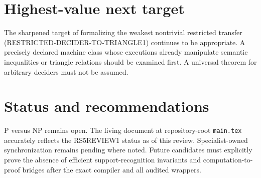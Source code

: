 \documentclass[11pt]{article}
\begin{document}
\section{Highest-value next target}
The sharpened target of formalizing the weakest nontrivial restricted transfer (RESTRICTED-DECIDER-TO-TRIANGLE1) continues to be appropriate. A precisely declared machine class whose executions already manipulate semantic inequalities or triangle relations should be examined first. A universal theorem for arbitrary deciders must not be assumed.

\section{Status and recommendations}
P versus NP remains open. The living document at repository-root \texttt{main.tex} accurately reflects the RS5REVIEW1 status as of this review. Specialist-owned synchronization remains pending where noted. Future candidates must explicitly prove the absence of efficient support-recognition invariants and computation-to-proof bridges after the exact compiler and all audited wrappers.

\end{document}
